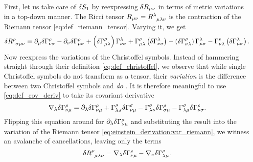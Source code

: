 First, let us take care of $\delta S_1$ by reexpressing $\delta R_{\mu \nu}$ in terms of metric variations in a top-down manner.
The Ricci tensor $R_{\mu \nu} = R\indices{^\lambda_\mu_\lambda_\nu}$ is the contraction of the Riemann tensor \eqref{eq:def_riemann_tensor}.
Varying it, we get
\begin{equation}
	\variation{R\indices{^\rho_\sigma_\mu_\nu}} = \partial_\mu \variation{\Gamma^\rho_{\nu \sigma}}
	                                            - \partial_\nu \variation{\Gamma^\rho_{\mu \sigma}}
												+ \left(\variation{\Gamma^\rho_{\mu \lambda}}\right) \Gamma^\lambda_{\nu \sigma}
												+ \Gamma^\rho_{\mu \lambda} \left(\variation{\Gamma^\lambda_{\nu \sigma}\right)}
												- \left(\variation{\Gamma^\rho_{\nu \lambda}}\right) \Gamma^\lambda_{\mu \sigma}
												- \Gamma^\rho_{\nu \lambda} \left(\variation{\Gamma^\lambda_{\mu \sigma}\right)} .
	\label{eq:einstein_derivation:var_riemann}
\end{equation}
Now reexpress the variations of the Christoffel symbols.
Instead of hammering straight through their definition \eqref{eq:def_christoffel}, we observe that while single Christoffel symbols do not transform as a tensor, their \emph{variation} is the difference between two Christoffel symbols and \emph{do} \cite[page 96,98]{ref:carroll}.
It is therefore meaningful to use \cref{eq:def_cov_deriv} to take its covariant derivative
\begin{equation}
	\nabla_\lambda \delta \Gamma^\rho_{\nu \mu} = \partial_\lambda \delta \Gamma^\rho_{\nu \mu} 
	                                                 + \Gamma^\rho_{\lambda \sigma} \delta \Gamma{^\sigma_{\nu \mu}} 
	                                                 - \Gamma^\sigma_{\lambda \nu} \delta \Gamma{^\rho_{\sigma \mu}} 
	                                                 - \Gamma^\sigma_{\lambda \mu} \delta \Gamma{^\rho_{\nu \sigma}} .
	\label{eq:einstein_derivation:christoffel_cov_deriv}
\end{equation}
Flipping this equation around for $\partial_\lambda \delta \Gamma^\rho_{\nu \mu}$ and substituting the result into the variation of the Riemann tensor \eqref{eq:einstein_derivation:var_riemann}, we witness an avalanche of cancellations, leaving only the terms
\begin{equation}
	\variation{R\indices{^\rho_\mu_\lambda_\nu}} = \nabla_\lambda \variation{\Gamma^\rho_{\nu \mu}}
	                                             - \nabla_\nu \variation{\Gamma^\rho_{\lambda \mu}} .
\end{equation}
